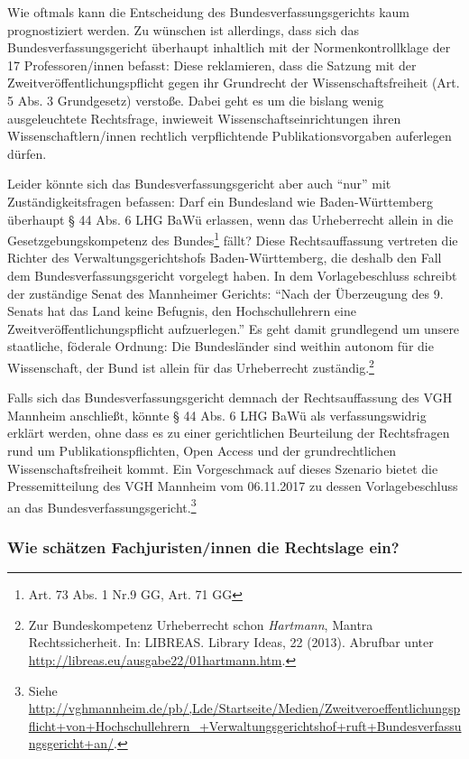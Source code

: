 \documentclass[a4paper,
fontsize=11pt,
oneside,
numbers=noperiodatend,
parskip=half-,
bibliography=totoc,
final
]{scrartcl}
\begin{document}
Wie oftmals kann die Entscheidung des Bundesverfassungsgerichts kaum
prognostiziert werden. Zu wünschen ist allerdings, dass sich das
Bundesverfassungsgericht überhaupt inhaltlich mit der
Normenkontrollklage der 17 Professoren/innen befasst: Diese reklamieren,
dass die Satzung mit der Zweit\-ver\-öffent\-lich\-ungs\-pflicht gegen ihr
Grundrecht der Wissenschaftsfreiheit (Art. 5 Abs. 3 Grundgesetz)
verstoße. Dabei geht es um die bislang wenig ausgeleuchtete Rechtsfrage,
inwieweit Wissenschaftseinrichtungen ihren Wissenschaftlern/innen
rechtlich verpflichtende Publikationsvorgaben auferlegen dürfen.

Leider könnte sich das Bundesverfassungsgericht aber auch \enquote{nur}
mit Zuständigkeitsfragen befassen: Darf ein Bundesland wie
Baden-Württemberg überhaupt § 44 Abs. 6 LHG BaWü erlassen, wenn das
Urheberrecht allein in die Gesetzgebungskompetenz des Bundes\footnote{Art.
  73 Abs. 1 Nr.9 GG, Art. 71 GG} fällt? Diese Rechtsauffassung vertreten
die Richter des Verwaltungsgerichtshofs Baden-Württemberg, die deshalb
den Fall dem Bundesverfassungsgericht vorgelegt haben. In dem
Vorlagebeschluss schreibt der zuständige Senat des Mannheimer Gerichts:
\enquote{Nach der Überzeugung des 9. Senats hat das Land keine Befugnis,
den Hochschullehrern eine Zweit\-ver\-öffent\-lich\-ungs\-pflicht aufzuerlegen.}
Es geht damit grundlegend um unsere staatliche, föderale Ordnung: Die
Bundesländer sind weithin autonom für die Wissenschaft, der Bund ist
allein für das Urheberrecht zuständig.\footnote{Zur Bundeskompetenz
  Urheberrecht schon \emph{Hartmann}, Mantra Rechtssicherheit. In:
  LIBREAS. Library Ideas, 22 (2013). Abrufbar unter
  \url{http://libreas.eu/ausgabe22/01hartmann.htm}.}

Falls sich das Bundesverfassungsgericht demnach der Rechtsauffassung des
VGH Mannheim anschließt, könnte § 44 Abs. 6 LHG BaWü als
verfassungswidrig erklärt werden, ohne dass es zu einer gerichtlichen
Beurteilung der Rechtsfragen rund um Publikationspflichten, Open Access
und der grundrechtlichen Wissenschaftsfreiheit kommt. Ein Vorgeschmack
auf dieses Szenario bietet die Pressemitteilung des VGH Mannheim vom
06.11.2017 zu dessen Vorlagebeschluss an das
Bundesverfassungsgericht.\footnote{Siehe
  \url{http://vghmannheim.de/pb/,Lde/Startseite/Medien/Zweitveroeffentlichungspflicht+von+Hochschullehrern_+Verwaltungsgerichtshof+ruft+Bundesverfassungsgericht+an/}.}

\hypertarget{wie-schuxe4tzen-fachjuristeninnen-die-rechtslage-ein}{%
\subsubsection{Wie schätzen Fachjuristen/innen die Rechtslage
ein?}\label{wie-schuxe4tzen-fachjuristeninnen-die-rechtslage-ein}}
\end{document}
